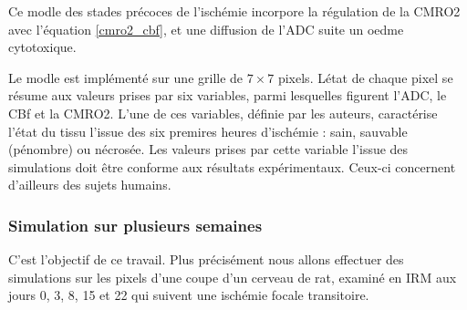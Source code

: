 \par
Ce modle des stades pr\'ecoces de l'isch\'emie incorpore la r\'egulation de la CMRO2 avec l'\'equation \ref{cmro2_cbf}, %
et une diffusion de l'ADC suite  un oedme cytotoxique.

\par
Le modle est impl\'ement\'e sur une grille de $7\times 7$ pixels. %
L\'etat de chaque pixel se r\'esume aux valeurs prises par six variables, parmi lesquelles figurent l'ADC, le CBf et la CMRO2. %
L'une de ces variables, d\'efinie par les auteurs, caract\'erise l'\'etat du tissu  l'issue des six premires heures d'isch\'emie : %
sain, sauvable (p\'enombre) ou n\'ecros\'ee. Les valeurs prises par cette variable  l'issue des simulations doit \^etre conforme aux r\'esultats exp\'erimentaux. %
Ceux-ci concernent d'ailleurs des sujets humains.

\subsubsection{Simulation sur plusieurs semaines}

C'est l'objectif de ce travail. Plus pr\'ecis\'ement nous allons effectuer des simulations sur les pixels d'une coupe d'un cerveau de rat, %
examin\'e en IRM aux jours 0, 3, 8, 15 et 22 qui suivent une isch\'emie focale transitoire.
